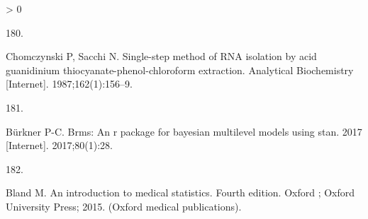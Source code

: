 \documentclass[twoside,10pt]{gihclass} %
\newlength{\cslhangindent}
\newlength{\csllabelwidth}
\newenvironment{CSLReferences}[3] %
 {%
  \setlength{\parindent}{0pt}
  \ifodd #1 \everypar{\setlength{\hangindent}{\cslhangindent}}\ignorespaces\fi
  \ifnum #2 > 0
  \setlength{\parskip}{#2\baselineskip}
  \fi
 }%
 {}
\newcommand{\CSLLeftMargin}[1]{\parbox[t]{\maxof{\widthof{#1}}{\csllabelwidth}}{#1}}
\newcommand{\CSLRightInline}[1]{\parbox[t]{\linewidth}{#1}}
\begin{document}
\begin{CSLReferences}{0}{0}
\leavevmode\hypertarget{ref-RN2672}{}%
\CSLLeftMargin{180. }
\CSLRightInline{Chomczynski P, Sacchi N. Single-step method of RNA isolation by acid guanidinium thiocyanate-phenol-chloroform extraction. Analytical Biochemistry {[}Internet{]}. 1987;162(1):156--9. }

\leavevmode\hypertarget{ref-RN2562}{}%
\CSLLeftMargin{181. }
\CSLRightInline{Bürkner P-C. Brms: An r package for bayesian multilevel models using stan. 2017 {[}Internet{]}. 2017;80(1):28. }

\leavevmode\hypertarget{ref-RN2007}{}%
\CSLLeftMargin{182. }
\CSLRightInline{Bland M. An introduction to medical statistics. Fourth edition. Oxford ; Oxford University Press; 2015. (Oxford medical publications). }

\end{CSLReferences}

\end{document}
